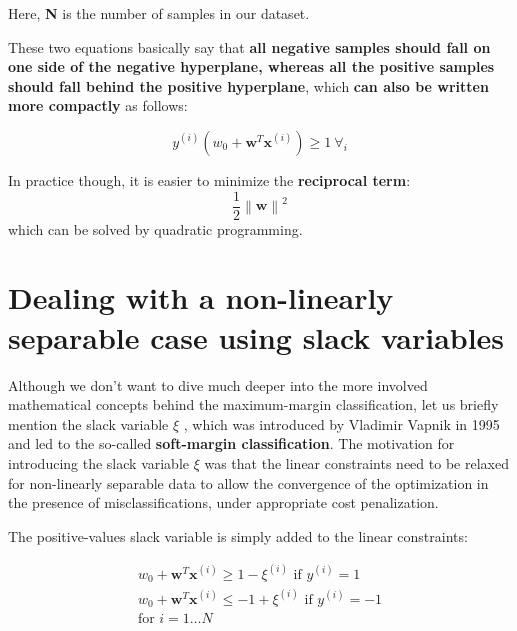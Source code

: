 \documentclass[11pt]{article}
\newcommand{\norm}[1]{\left\lVert#1\right\rVert}
\newcommand{\vect}[1]{\boldsymbol{#1}}
\begin{document}
    Here, \textbf{N} is the number of samples in our dataset.

    These two equations basically say that \textbf{all negative samples should fall on one side of the negative hyperplane,
    whereas all the positive samples should fall behind the positive hyperplane}, which \textbf{can also be written more
    compactly} as follows:

    \begin{equation}
        \label{eq:svm_cons_comp}
        y^{(i)} \left( w_0 + \vect{w}^T \vect{x}^{(i)} \right) \geq 1 ~ \forall_i
    \end{equation}

    In practice though, it is easier to minimize the \textbf{reciprocal term}:
    \begin{equation}
        \label{eq:svm_margin_reciprocal}
        \frac{1} {2} \norm{\vect{w}}^2
    \end{equation}
    which can be solved by quadratic programming.

    \section{Dealing with a non-linearly separable case using slack variables} \label{sec:slack_vars}

    Although we don't want to dive much deeper into the more involved mathematical concepts behind the maximum-margin
    classification, let us briefly mention the slack variable $\xi$ , which was introduced by Vladimir Vapnik in
    1995 and led to the so-called \textbf{soft-margin classification}.
    The motivation for introducing the slack variable $\xi$ was that the linear constraints need to be relaxed for
    non-linearly separable data to allow the convergence of the optimization in the presence of misclassifications,
    under appropriate cost penalization.

    The positive-values slack variable is simply added to the linear constraints:

    \begin{equation}
        \label{eq:svm_constraints_slack}
        \begin{gathered}
            w_0 + \boldsymbol{w}^T \boldsymbol{x}^{(i)} \geq 1 - \xi^{(i)} \text{ if } y^{(i)} = 1 \\
            w_0 + \boldsymbol{w}^T \boldsymbol{x}^{(i)} \leq - 1 + \xi^{(i)} \text{ if } y^{(i)} = -1 \\
            \text{for } i=1 \dots N
        \end{gathered}
    \end{equation}
\end{document}
